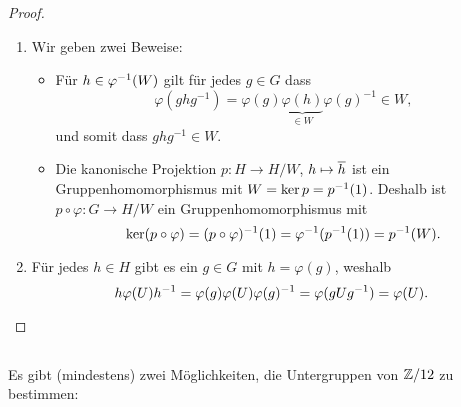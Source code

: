 \begin{proof}
  \begin{enumerate}
    \item
      Wir geben zwei Beweise:
      \begin{itemize}
        \item
          Für $h \in \varphi^{-1}(W)$ gilt für jedes $g \in G$ dass
          \[
                \varphi( g h g^{-1} )
            =   \varphi(g) \underbrace{\varphi(h)}_{\in W} \varphi(g)^{-1}
            \in W,
          \]
          und somit dass $g h g^{-1} \in W$.
        \item
          Die kanonische Projektion $p \colon H \to H/W$, $h \mapsto \overline{h}$ ist ein Gruppenhomomorphismus mit $W = \ker p = p^{-1}(1)$.
          Deshalb ist $p \circ \varphi \colon G \to H/W$ ein Gruppenhomomorphismus mit
          \[
              \ker (p \circ \varphi)
            = (p \circ \varphi)^{-1}(1)
            = \varphi^{-1}(p^{-1}(1))
            = p^{-1}(W).
          \]
      \end{itemize}
    \item
      Für jedes $h \in H$ gibt es ein $g \in G$ mit $h = \varphi(g)$, weshalb
      \[
          h \varphi(U) h^{-1}
        = \varphi(g) \varphi(U) \varphi(g)^{-1}
        = \varphi( g U g^{-1} )
        = \varphi(U).
        \qedhere
      \]
  \end{enumerate}
\end{proof}





\subsection{}

Es gibt (mindestens) zwei Möglichkeiten, die Untergruppen von $\mathbb{Z}/12$ zu bestimmen:

